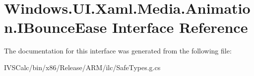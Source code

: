 \hypertarget{interface_windows_1_1_u_i_1_1_xaml_1_1_media_1_1_animation_1_1_i_bounce_ease}{}\section{Windows.\+U\+I.\+Xaml.\+Media.\+Animation.\+I\+Bounce\+Ease Interface Reference}
\label{interface_windows_1_1_u_i_1_1_xaml_1_1_media_1_1_animation_1_1_i_bounce_ease}


The documentation for this interface was generated from the following file\+:\begin{DoxyCompactItemize}
\item 
I\+V\+S\+Calc/bin/x86/\+Release/\+A\+R\+M/ilc/Safe\+Types.\+g.\+cs\end{DoxyCompactItemize}
